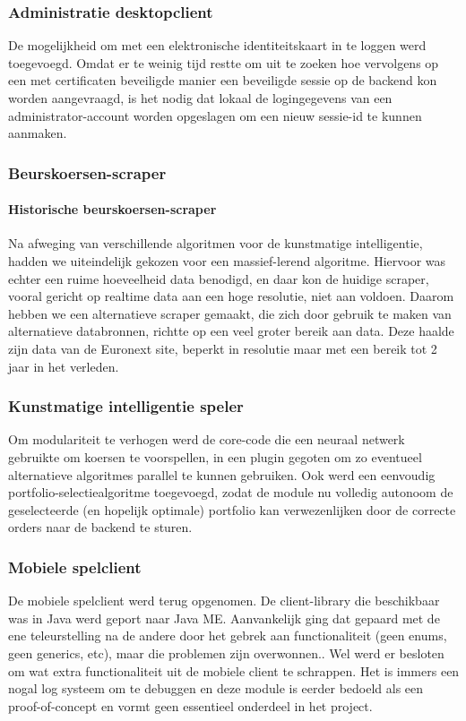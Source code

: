 \subsubsection{Administratie desktopclient}
De mogelijkheid om met een elektronische identiteitskaart in te loggen werd toegevoegd. Omdat er te weinig tijd restte om uit te zoeken hoe vervolgens op een met certificaten beveiligde manier een beveiligde sessie op de backend kon worden aangevraagd, is het nodig dat lokaal de logingegevens van een administrator-account worden opgeslagen om een nieuw sessie-id te kunnen aanmaken.

\subsubsection{Beurskoersen-scraper}

\paragraph{Historische beurskoersen-scraper}
Na afweging van verschillende algoritmen voor de kunstmatige intelligentie, hadden we uiteindelijk gekozen voor een massief-lerend algoritme. Hiervoor was echter een ruime hoeveelheid data benodigd, en daar kon de huidige scraper, vooral gericht op realtime data aan een hoge resolutie, niet aan voldoen. Daarom hebben we een alternatieve scraper gemaakt, die zich door gebruik te maken van alternatieve databronnen, richtte op een veel groter bereik aan data. Deze haalde zijn data van de Euronext site, beperkt in resolutie maar met een bereik tot 2 jaar in het verleden.

\subsubsection{Kunstmatige intelligentie speler}
Om modulariteit te verhogen werd de core-code die een neuraal netwerk gebruikte om koersen te voorspellen, in een plugin gegoten om zo eventueel alternatieve algoritmes parallel te kunnen gebruiken. Ook werd een eenvoudig portfolio-selectiealgoritme toegevoegd, zodat de module nu volledig autonoom de geselecteerde (en hopelijk optimale) portfolio kan verwezenlijken door de correcte orders naar de backend te sturen.

\subsubsection{Mobiele spelclient}
De mobiele spelclient werd terug opgenomen. De client-library die beschikbaar was in Java werd geport naar Java ME. Aanvankelijk ging dat gepaard met de ene teleurstelling na de andere door het gebrek aan functionaliteit (geen enums, geen generics, etc), maar die problemen zijn overwonnen.. Wel werd er besloten om wat extra functionaliteit uit de mobiele client te schrappen. Het is immers een nogal log systeem om te debuggen en deze module is eerder bedoeld als een proof-of-concept en vormt geen essentieel onderdeel in het project.

